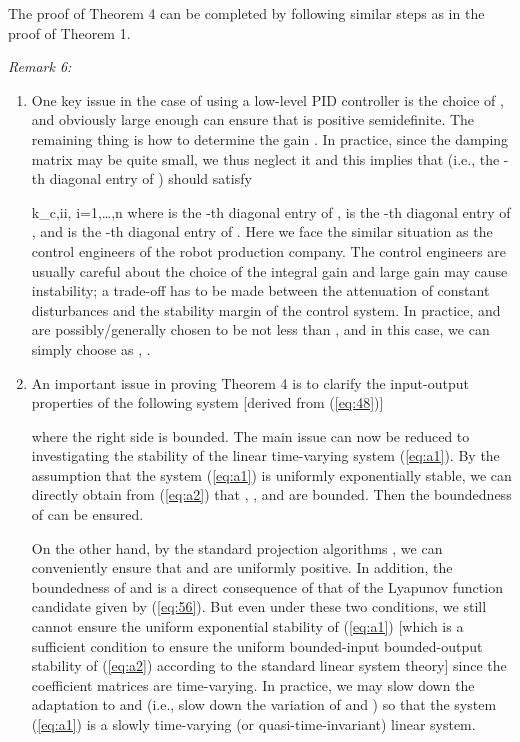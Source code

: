 \documentclass[9pt,technote]{IEEEtran}
\def \be {}
\begin{document}
{The proof of Theorem 4 can be completed by following similar steps as in the proof of Theorem 1.

\emph{Remark 6:} \begin{enumerate}

\item One key issue in the case of using a low-level PID controller is the choice of , and obviously large enough  can ensure that  is positive semidefinite. The remaining thing is how to determine the gain . In practice, since the damping matrix  may be quite small, we thus neglect it and this implies that  (i.e., the -th diagonal entry of ) should satisfy
\be
\label{eq:58}
k_{c,ii}\ge{}, \forall i=1,\dots,n
\ee
where  is the -th diagonal entry of ,  is the -th diagonal entry of , and  is the -th diagonal entry of . Here we face the similar situation as the control engineers of the robot production company. The control engineers are usually careful about the choice of the integral gain and large gain may cause instability; a trade-off has to be made between the attenuation of constant disturbances and the stability margin of the control system. In practice,  and  are possibly/generally chosen to be not less than , and in this case, we can simply choose  as , .

\item An important issue in proving Theorem 4 is to clarify the input-output properties of
 the following system [derived from (\ref{eq:48})]

where the right side is bounded. The main issue can now be reduced to investigating the stability of the linear time-varying system (\ref{eq:a1}). By the assumption that the system (\ref{eq:a1}) is uniformly exponentially stable, we can directly obtain from (\ref{eq:a2})
that , , and  are bounded. Then the boundedness of 
can be ensured.

On the other hand, by the standard projection algorithms \cite{Ioannou1996_Book}, we can conveniently ensure that  and
 are uniformly positive. In addition, the boundedness of  and
 is a direct consequence of that of the Lyapunov function
candidate given by (\ref{eq:56}). But even under these two conditions, we still cannot ensure the uniform exponential stability of (\ref{eq:a1}) [which is a sufficient condition to ensure the uniform bounded-input bounded-output stability of (\ref{eq:a2}) according
to the standard linear system theory]
since the coefficient matrices are time-varying. In practice, we may slow down the adaptation to  and  (i.e., slow down the variation of 
and ) so that the system (\ref{eq:a1}) is a slowly time-varying (or quasi-time-invariant) linear system.



\end{enumerate}}
\end{document}
